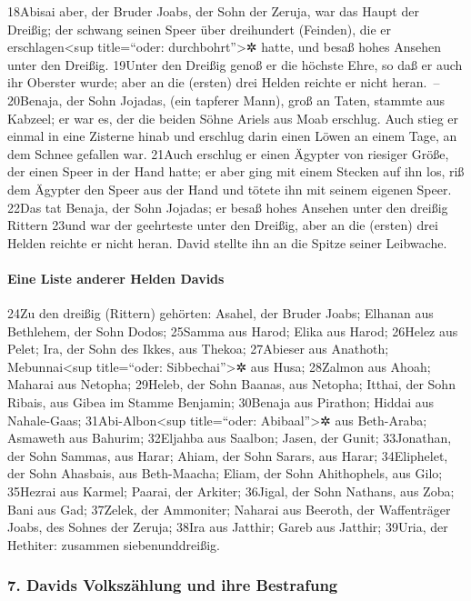 18Abisai aber, der Bruder Joabs, der Sohn der Zeruja, war das Haupt der
Dreißig; der schwang seinen Speer über dreihundert (Feinden), die er
erschlagen\textless sup title=``oder: durchbohrt''\textgreater✲ hatte,
und besaß hohes Ansehen unter den Dreißig. 19Unter den Dreißig genoß er
die höchste Ehre, so daß er auch ihr Oberster wurde; aber an die
(ersten) drei Helden reichte er nicht heran.~-- 20Benaja, der Sohn
Jojadas, (ein tapferer Mann), groß an Taten, stammte aus Kabzeel; er war
es, der die beiden Söhne Ariels aus Moab erschlug. Auch stieg er einmal
in eine Zisterne hinab und erschlug darin einen Löwen an einem Tage, an
dem Schnee gefallen war. 21Auch erschlug er einen Ägypter von riesiger
Größe, der einen Speer in der Hand hatte; er aber ging mit einem Stecken
auf ihn los, riß dem Ägypter den Speer aus der Hand und tötete ihn mit
seinem eigenen Speer. 22Das tat Benaja, der Sohn Jojadas; er besaß hohes
Ansehen unter den dreißig Rittern 23und war der geehrteste unter den
Dreißig, aber an die (ersten) drei Helden reichte er nicht heran. David
stellte ihn an die Spitze seiner Leibwache.

\hypertarget{eine-liste-anderer-helden-davids}{%
\paragraph{Eine Liste anderer Helden
Davids}\label{eine-liste-anderer-helden-davids}}

24Zu den dreißig (Rittern) gehörten: Asahel, der Bruder Joabs; Elhanan
aus Bethlehem, der Sohn Dodos; 25Samma aus Harod; Elika aus Harod;
26Helez aus Pelet; Ira, der Sohn des Ikkes, aus Thekoa; 27Abieser aus
Anathoth; Mebunnai\textless sup title=``oder: Sibbechai''\textgreater✲
aus Husa; 28Zalmon aus Ahoah; Maharai aus Netopha; 29Heleb, der Sohn
Baanas, aus Netopha; Itthai, der Sohn Ribais, aus Gibea im Stamme
Benjamin; 30Benaja aus Pirathon; Hiddai aus Nahale-Gaas;
31Abi-Albon\textless sup title=``oder: Abibaal''\textgreater✲ aus
Beth-Araba; Asmaweth aus Bahurim; 32Eljahba aus Saalbon; Jasen, der
Gunit; 33Jonathan, der Sohn Sammas, aus Harar; Ahiam, der Sohn Sarars,
aus Harar; 34Eliphelet, der Sohn Ahasbais, aus Beth-Maacha; Eliam, der
Sohn Ahithophels, aus Gilo; 35Hezrai aus Karmel; Paarai, der Arkiter;
36Jigal, der Sohn Nathans, aus Zoba; Bani aus Gad; 37Zelek, der
Ammoniter; Naharai aus Beeroth, der Waffenträger Joabs, des Sohnes der
Zeruja; 38Ira aus Jatthir; Gareb aus Jatthir; 39Uria, der Hethiter:
zusammen siebenunddreißig.

\hypertarget{davids-volkszuxe4hlung-und-ihre-bestrafung}{%
\subsubsection{7. Davids Volkszählung und ihre
Bestrafung}\label{davids-volkszuxe4hlung-und-ihre-bestrafung}}


